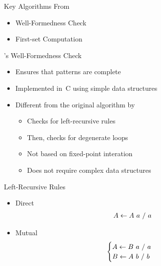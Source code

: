 \documentclass{beamer}
\begin{document}
\begin{frame}{Key Algorithms From \lpeg{}}
    \begin{itemize}
        \item Well-Formedness Check
        \item First-set Computation
    \end{itemize}
\end{frame}

\begin{frame}{\lpeg{}'s Well-Formedness Check}
    \begin{itemize}
        \item Ensures that patterns are complete
        \item Implemented in~C using simple data structures
        \item Different from the original algorithm by \citeauthor{ford_parsing_2004}
        \begin{itemize}
            \item Checks for left-recursive rules
            \item Then, checks for degenerate loops
            \item Not based on fixed-point interation
            \item Does not require complex data structures
        \end{itemize}
    \end{itemize}
\end{frame}

\begin{frame}{Left-Recursive Rules}
    \begin{itemize}
        \item Direct
        \begin{align*}
            A \leftarrow A\ a\ /\ a
        \end{align*}
        \item Mutual
        \begin{align*}
            \begin{cases}
               A \leftarrow B\ a\ /\ a \\
               B \leftarrow A\ b\ /\ b
            \end{cases}
        \end{align*}
    \end{itemize}
\end{frame}
\end{document}

